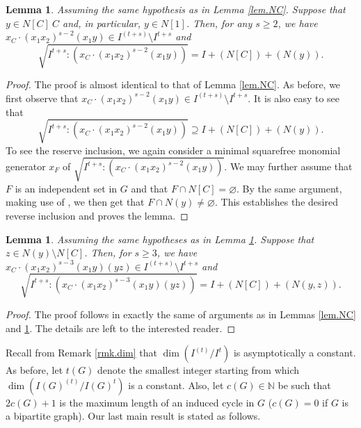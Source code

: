 \documentclass[12pt]{amsart}
\numberwithin{equation}{section}
\newtheorem{lemma}[theorem]{Lemma}
\theoremstyle{definition}
\theoremstyle{definition}
\newcommand{\NN}{{\mathbb N}}
\begin{document}
\begin{lemma}
	\label{lem.NCy}
	Assuming the same hypothesis as in Lemma \ref{lem.NC}. Suppose that $y \in N[C] \ C$ and, in particular, $y \in N[1]$. Then, for any $s \ge 2$, we have $x_C \cdot (x_1x_2)^{s-2}(x_1y) \in I^{(t+s)} \setminus I^{t+s}$ and
	$$\sqrt{I^{t+s} : (x_C \cdot (x_1x_2)^{s-2} (x_1y))} = I + (N[C]) + (N(y)).$$
\end{lemma}

\begin{proof}
	The proof is almost identical to that of Lemma \ref{lem.NC}. As before, we first observe that $x_C \cdot (x_1x_2)^{s-2}(x_1y) \in I^{(t+s)} \setminus I^{t+s}$. It is also easy to see that 
	$$\sqrt{I^{t+s} : (x_C \cdot (x_1x_2)^{s-2} (x_1y))} \supseteq I + (N[C]) + (N(y)).$$
	To see the reserve inclusion, we again consider a minimal squarefree monomial generator $x_F$ of $\sqrt{I^{t+s} : (x_C \cdot (x_1x_2)^{s-2} (x_1y))}$. We may further assume that $F$ is an independent set in $G$ and that $F \cap N[C] = \varnothing.$ By the same argument, making use of \cite[Lemma 2.18]{MV2023}, we then get that $F \cap N(y) \not= \varnothing$. This establishes the desired reverse inclusion and proves the lemma.
\end{proof}

\begin{lemma} \label{lem.NCyz}
	Assuming the same hypotheses as in Lemma \ref{lem.NCy}. Suppose that $z \in N(y) \setminus N[C]$. Then, for $s \ge 3$, we have $x_C \cdot (x_1x_2)^{s-3}(x_1y)(yz) \in I^{(t+s)} \setminus I^{t+s}$ and 
	$$\sqrt{I^{t+s} : (x_C \cdot (x_1x_2)^{s-3}(x_1y)(yz))} = I + (N[C]) + (N(y,z)).$$
\end{lemma}

\begin{proof}
	The proof follows in exactly the same of arguments as in Lemmas \ref{lem.NC} and \ref{lem.NCy}. The details are left to the interested reader.
\end{proof}

Recall from Remark \ref{rmk.dim} that $\dim (I^{(t)}/I^t)$ is asymptotically a constant. As before, let $t(G)$ denote the smallest integer starting from which $\dim (I(G)^{(t)}/I(G)^t)$ is a constant. Also, let $c(G) \in \NN$ be such that $2c(G)+1$ is the maximum length of an induced cycle in $G$ ($c(G) = 0$ if $G$ is a bipartite graph). Our last main result is stated as follows.
\end{document}
